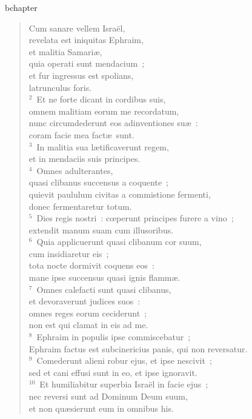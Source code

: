 bchapter\begin{flushleft}\begin{verse}\vspace{-19pt}Cum sanare vellem Isra\"el,\\ revelata est iniquitas Ephraim,\\ et malitia Samari\ae ,\\ quia operati sunt mendacium~;\\ et fur ingressus est spolians,\\ latrunculus foris.\\
${}^{2}$~Et ne forte dicant in cordibus suis,\\ omnem malitiam eorum me recordatum,\\ nunc circumdederunt eos adinventiones su\ae~:\\ coram facie mea fact\ae\ sunt.\\
${}^{3}$~In malitia sua l\ae tificaverunt regem,\\ et in mendaciis suis principes.\\
${}^{4}$~Omnes adulterantes,\\ quasi clibanus succensus a coquente~;\\ quievit paululum civitas a commistione fermenti,\\ donec fermentaretur totum.\\
${}^{5}$~Dies regis nostri~: cœperunt principes furere a vino~;\\ extendit manum suam cum illusoribus.\\
${}^{6}$~Quia applicuerunt quasi clibanum cor suum,\\ cum insidiaretur eis~;\\ tota nocte dormivit coquens eos~:\\ mane ipse succensus quasi ignis flamm\ae .\\
${}^{7}$~Omnes calefacti sunt quasi clibanus,\\ et devoraverunt judices suos~:\\ omnes reges eorum ceciderunt~;\\ non est qui clamat in eis ad me.\\
${}^{8}$~Ephraim in populis ipse commiscebatur~;\\ Ephraim factus est subcinericius panis, qui non reversatur.\\
${}^{9}$~Comederunt alieni robur ejus, et ipse nescivit~;\\ sed et cani effusi sunt in eo, et ipse ignoravit.\\
${}^{10}$~Et humiliabitur superbia Isra\"el in facie ejus~;\\ nec reversi sunt ad Dominum Deum suum,\\ et non qu\ae sierunt eum in omnibus his.\\

\end{verse}
\end{flushleft}
